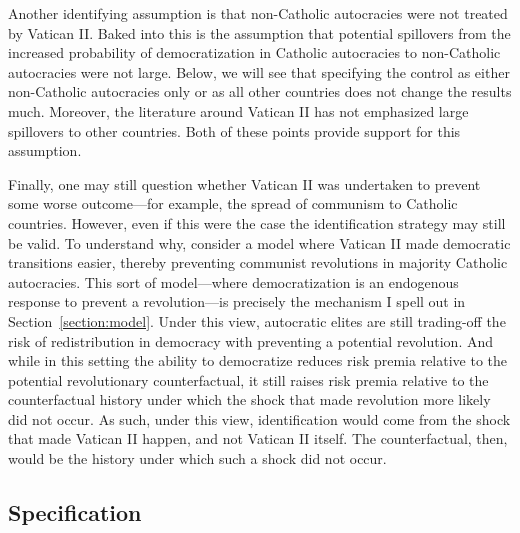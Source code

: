 \documentclass[12pt]{article}
\numberwithin{equation}{section}
\begin{document}
\label{par:acknowledge_other_country}
Another identifying assumption is that non-Catholic autocracies were not treated by Vatican II. Baked into this is the assumption that potential spillovers from the increased probability of democratization in Catholic autocracies to non-Catholic autocracies were not large. Below, we will see that specifying the control as either non-Catholic autocracies only or as all other countries does not change the results much. Moreover, the literature around Vatican II has not emphasized large spillovers to other countries. Both of these points provide support for this assumption.

\label{par:acknowledge_counter_history}
Finally, one may still question whether Vatican II was undertaken to prevent some worse outcome---for example, the spread of communism to Catholic countries. However, even if this were the case the identification strategy may still be valid. To understand why, consider a model where Vatican II made democratic transitions easier, thereby preventing communist revolutions in majority Catholic autocracies. This sort of model---where democratization is an endogenous response to prevent a revolution---is precisely the mechanism I spell out in Section~\ref{section:model}. Under this view, autocratic elites are still trading-off the risk of redistribution in democracy with preventing a potential revolution. And while in this setting the ability to democratize reduces risk premia relative to the potential revolutionary counterfactual, it still raises risk premia relative to the counterfactual history under which the shock that made revolution more likely did not occur. As such, under this view, identification would come from the shock that made Vatican II happen, and not Vatican II itself.  The counterfactual, then, would be the history under which such a shock did not occur.

\subsection{Specification}
\end{document}
